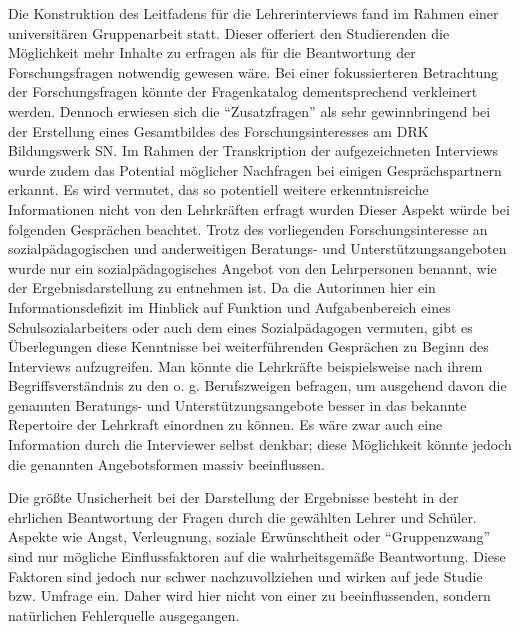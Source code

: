 Die Konstruktion des Leitfadens für die Lehrerinterviews fand im Rahmen einer universitären Gruppenarbeit statt. Dieser offeriert den Studierenden die Möglichkeit mehr Inhalte zu erfragen als für die Beantwortung der Forschungsfragen notwendig gewesen wäre. Bei einer fokussierteren Betrachtung  der Forschungsfragen könnte der Fragenkatalog dementsprechend verkleinert werden. Dennoch erwiesen sich die "`Zusatzfragen"' als sehr gewinnbringend bei der Erstellung eines Gesamtbildes des Forschungsinteresses am DRK Bildungswerk SN. Im Rahmen der Transkription der aufgezeichneten Interviews wurde zudem das Potential möglicher Nachfragen bei einigen Gesprächspartnern erkannt. Es wird vermutet, das so potentiell weitere erkenntnisreiche Informationen nicht von den Lehrkräften erfragt wurden Dieser Aspekt würde bei folgenden Gesprächen beachtet. Trotz des vorliegenden Forschungsinteresse an sozialpädagogischen und anderweitigen Beratungs- und Unterstützungsangeboten wurde nur ein sozialpädagogisches Angebot von den Lehrpersonen benannt, wie der Ergebnisdarstellung zu entnehmen ist. Da die Autorinnen hier ein Informationsdefizit im Hinblick auf Funktion und Aufgabenbereich eines Schulsozialarbeiters oder auch dem eines Sozialpädagogen vermuten, gibt es Überlegungen diese Kenntnisse bei weiterführenden Gesprächen zu Beginn des Interviews aufzugreifen. Man könnte die Lehrkräfte beispielsweise nach ihrem Begriffsverständnis zu den o. g. Berufszweigen befragen, um ausgehend davon die genannten Beratungs- und Unterstützungsangebote besser in das bekannte Repertoire der Lehrkraft einordnen zu können. Es wäre zwar auch eine Information durch die Interviewer selbst denkbar; diese Möglichkeit könnte jedoch die genannten Angebotsformen massiv beeinflussen.

Die größte Unsicherheit bei der Darstellung der Ergebnisse besteht in der ehrlichen Beantwortung der Fragen durch die gewählten Lehrer und Schüler. Aspekte wie Angst, Verleugnung, soziale Erwünschtheit oder "`Gruppenzwang"' sind nur mögliche Einflussfaktoren auf die wahrheitsgemäße Beantwortung. Diese Faktoren sind jedoch nur schwer nachzuvollziehen und wirken auf jede Studie bzw. Umfrage ein. Daher wird hier nicht von einer zu beeinflussenden, sondern natürlichen Fehlerquelle ausgegangen.